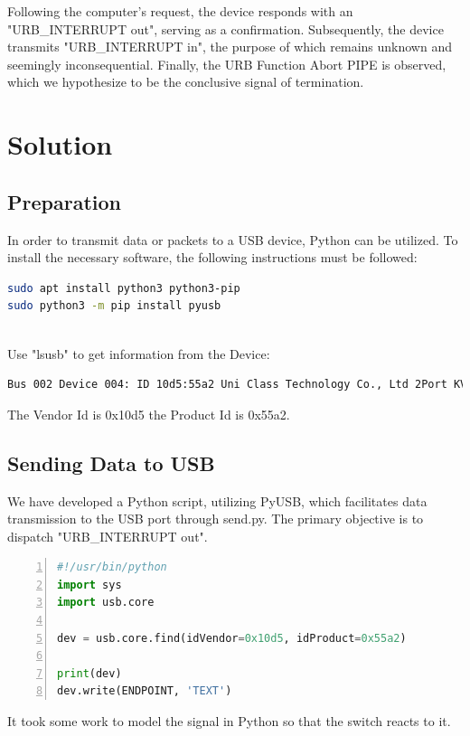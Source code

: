 Following the computer's request, the device responds with an "URB\_INTERRUPT out", serving as a confirmation. Subsequently, the device transmits "URB\_INTERRUPT in", the purpose of which remains unknown and seemingly inconsequential. Finally, the URB Function Abort PIPE is observed, which we hypothesize to be the conclusive signal of termination.

\section{Solution}
\subsection{Preparation}
In order to transmit data or packets to a USB device, Python can be utilized. To install the necessary software, the following instructions must be followed:

\begin{lstlisting}[language=Bash, basicstyle=\small]
sudo apt install python3 python3-pip
sudo python3 -m pip install pyusb
\end{lstlisting} 

\  \\

Use "lsusb" to get information from the Device:
\begin{lstlisting}[language=Bash, basicstyle=\small]
Bus 002 Device 004: ID 10d5:55a2 Uni Class Technology Co., Ltd 2Port KVMSwitcher
\end{lstlisting}
The Vendor Id is 0x10d5 the Product Id is 0x55a2.

\subsection{Sending Data to USB}
We have developed a Python script, utilizing PyUSB\cite{PyUSB}, which facilitates data transmission to the USB port through send.py. The primary objective is to dispatch "URB\_INTERRUPT out".

\begin{lstlisting}[language=Python,numbers=left, basicstyle=\small]
#!/usr/bin/python
import sys
import usb.core

dev = usb.core.find(idVendor=0x10d5, idProduct=0x55a2)

print(dev)
dev.write(ENDPOINT, 'TEXT')
\end{lstlisting}

It took some work to model the signal in Python so that the switch reacts to it.

